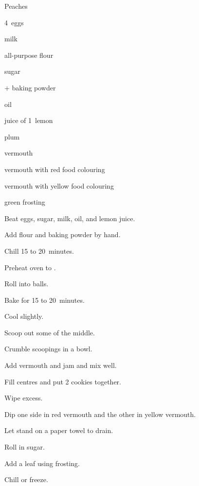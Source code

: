 \begin{recipe}{Peaches}{}{}

\begin{ingredients}
\item 4~eggs
\item {} milk
\item {} all-purpose flour
\item \C{1\half} sugar
\item {}$+$ baking powder
\item \C{1\quarter} oil
\item juice of 1~lemon
\item {} plum 
\item \C{\threequarter} vermouth
\item vermouth with red food colouring
\item vermouth with yellow food colouring
\item green frosting
\end{ingredients}

\begin{directions}
\item Beat eggs, sugar, milk, oil, and lemon juice.
\item Add flour and baking powder by hand.
\item Chill 15 to 20~minutes.
\item Preheat oven to .
\item Roll into  balls.
\item Bake for 15 to 20~minutes.
\item Cool slightly.
\item Scoop out some of the middle.
\item Crumble scoopings in a bowl.
\item Add vermouth and jam and mix well.
\item Fill centres and put 2 cookies together.
\item Wipe excess.
\item Dip one side in red vermouth and the other in yellow vermouth.
\item Let stand on a paper towel to drain.
\item Roll in sugar.
\item Add a leaf using frosting.
\item Chill or freeze.
\end{directions}

\end{recipe}

